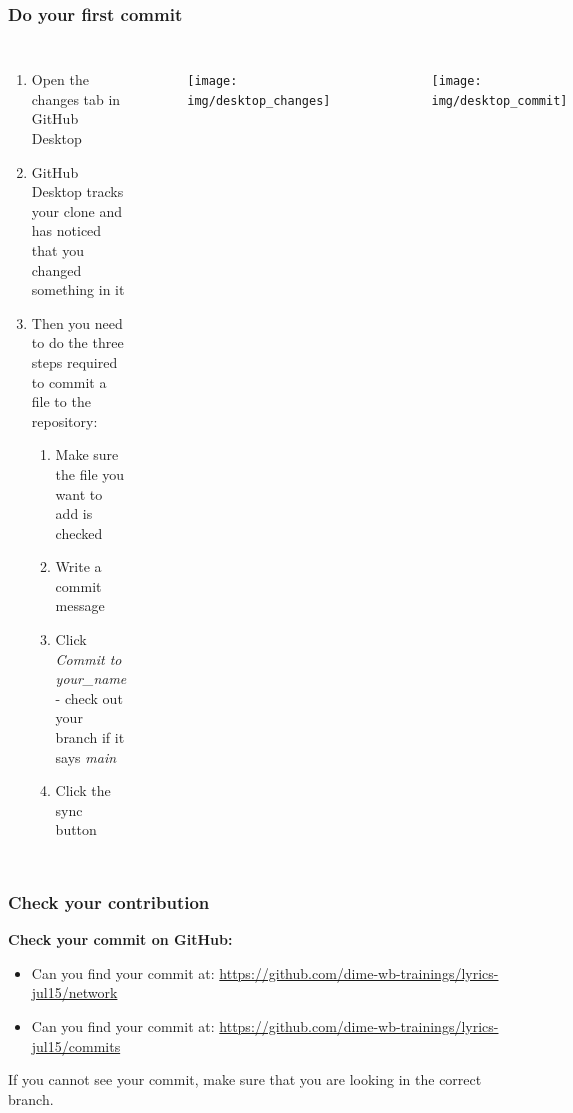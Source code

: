 \documentclass[aspectratio=169]{beamer}
\newcommand{\trainingURL}[1]{{\color{blue}\url{#1}}}
\newcommand{\traininerUsername}{dime-wb-trainings}
\newcommand{\repoName}{\traininerUsername/lyrics-jul15}
\newcommand{\trainingRepoURLwithParameter}[1]{\trainingURL{https://github.com/\repoName#1}}
\begin{document}
\begin{frame}
\frametitle{Do your first commit}

\begin{columns}[c]


\begin{enumerate}
	\item Open the changes tab in GitHub Desktop
	\item GitHub Desktop tracks your clone and has noticed that you changed something in it
	\item Then you need to do the three steps required to commit a file to the repository:
	\begin{enumerate}
		\item Make sure the file you want to add is checked
		\item Write a commit message
		\item Click \textit{Commit to your\_name} - check out your branch if it says \textit{main}
		\item Click the sync button
	\end{enumerate}
\end{enumerate}

\begin{figure}
	\centering
	\texttt{[image: img/desktop\_changes]}
	\label{fig:desktopchanges}
\end{figure}

\vspace{-1cm}

\begin{figure}
	\centering
	\texttt{[image: img/desktop\_commit]}
	\label{fig:desktop_commit}
\end{figure}

\end{columns}

\end{frame}

\begin{frame}
\frametitle{Check your contribution}

	\textbf{Check your commit on GitHub:}
	\begin{itemize}
		\item Can you find your commit at: \trainingRepoURLwithParameter{/network}
		\item Can you find your commit at: \trainingRepoURLwithParameter{/commits}
	\end{itemize}

	If you cannot see your commit, make sure that you are looking in the correct branch.

\end{frame}
\end{document}
